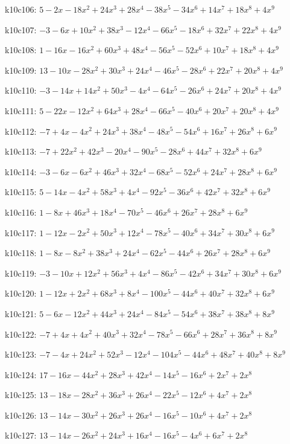 k10c106: $ 5-2x-18x^{2}+24x^{3}+28x^{4}-38x^{5}-34x^{6}+14x^{7}+18x^{8}+4x^{9} $ 

k10c107: $ -3-6x+10x^{2}+38x^{3}-12x^{4}-66x^{5}-18x^{6}+32x^{7}+22x^{8}+4x^{9} $ 

k10c108: $ 1-16x-16x^{2}+60x^{3}+48x^{4}-56x^{5}-52x^{6}+10x^{7}+18x^{8}+4x^{9} $ 

k10c109: $ 13-10x-28x^{2}+30x^{3}+24x^{4}-46x^{5}-28x^{6}+22x^{7}+20x^{8}+4x^{9} $ 

k10c110: $ -3-14x+14x^{2}+50x^{3}-4x^{4}-64x^{5}-26x^{6}+24x^{7}+20x^{8}+4x^{9} $ 

k10c111: $ 5-22x-12x^{2}+64x^{3}+28x^{4}-66x^{5}-40x^{6}+20x^{7}+20x^{8}+4x^{9} $ 

k10c112: $ -7+4x-4x^{2}+24x^{3}+38x^{4}-48x^{5}-54x^{6}+16x^{7}+26x^{8}+6x^{9} $ 

k10c113: $ -7+22x^{2}+42x^{3}-20x^{4}-90x^{5}-28x^{6}+44x^{7}+32x^{8}+6x^{9} $ 

k10c114: $ -3-6x-6x^{2}+46x^{3}+32x^{4}-68x^{5}-52x^{6}+24x^{7}+28x^{8}+6x^{9} $ 

k10c115: $ 5-14x-4x^{2}+58x^{3}+4x^{4}-92x^{5}-36x^{6}+42x^{7}+32x^{8}+6x^{9} $ 

k10c116: $ 1-8x+46x^{3}+18x^{4}-70x^{5}-46x^{6}+26x^{7}+28x^{8}+6x^{9} $ 

k10c117: $ 1-12x-2x^{2}+50x^{3}+12x^{4}-78x^{5}-40x^{6}+34x^{7}+30x^{8}+6x^{9} $ 

k10c118: $ 1-8x-8x^{2}+38x^{3}+24x^{4}-62x^{5}-44x^{6}+26x^{7}+28x^{8}+6x^{9} $ 

k10c119: $ -3-10x+12x^{2}+56x^{3}+4x^{4}-86x^{5}-42x^{6}+34x^{7}+30x^{8}+6x^{9} $ 

k10c120: $ 1-12x+2x^{2}+68x^{3}+8x^{4}-100x^{5}-44x^{6}+40x^{7}+32x^{8}+6x^{9} $ 

k10c121: $ 5-6x-12x^{2}+44x^{3}+24x^{4}-84x^{5}-54x^{6}+38x^{7}+38x^{8}+8x^{9} $ 

k10c122: $ -7+4x+4x^{2}+40x^{3}+32x^{4}-78x^{5}-66x^{6}+28x^{7}+36x^{8}+8x^{9} $ 

k10c123: $ -7-4x+24x^{2}+52x^{3}-12x^{4}-104x^{5}-44x^{6}+48x^{7}+40x^{8}+8x^{9} $ 

k10c124: $ 17-16x-44x^{2}+28x^{3}+42x^{4}-14x^{5}-16x^{6}+2x^{7}+2x^{8} $ 

k10c125: $ 13-18x-28x^{2}+36x^{3}+26x^{4}-22x^{5}-12x^{6}+4x^{7}+2x^{8} $ 

k10c126: $ 13-14x-30x^{2}+26x^{3}+26x^{4}-16x^{5}-10x^{6}+4x^{7}+2x^{8} $ 

k10c127: $ 13-14x-26x^{2}+24x^{3}+16x^{4}-16x^{5}-4x^{6}+6x^{7}+2x^{8} $ 

